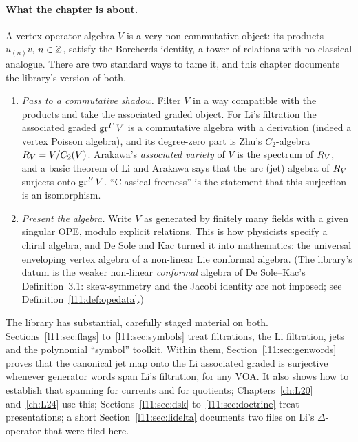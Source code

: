 \paragraph{What the chapter is about.} A vertex operator algebra $V$ is a very non-commutative
object: its products $u_{(n)}v$, $n\in{\mathbb{Z}}$, satisfy the Borcherds identity, a tower of
relations with no classical analogue. There are two standard ways to tame it, and this chapter
documents the library's version of both.
\begin{enumerate}
\item \emph{Pass to a commutative shadow.} Filter $V$ in a way compatible with the products and
  take the associated graded object. For Li's filtration the associated graded
  $\operatorname{gr}^F V$ is a commutative algebra with a derivation (indeed a vertex Poisson
  algebra), and its degree-zero part is Zhu's $C_2$-algebra $R_V = V/C_2(V)$. Arakawa's
  \emph{associated variety} of $V$ is the spectrum of $R_V$, and a basic theorem of Li and
  Arakawa says that the arc (jet) algebra of $R_V$ surjects onto $\operatorname{gr}^F V$.
  ``Classical freeness'' is the statement that this surjection is an isomorphism.
\item \emph{Present the algebra.} Write $V$ as generated by finitely many fields with a given
  singular OPE, modulo explicit relations. This is how physicists specify a chiral algebra, and De
  Sole and Kac turned it into mathematics: the universal enveloping vertex algebra of a
  non-linear Lie conformal algebra. (The library's datum  is the weaker non-linear \emph{conformal} algebra of
  De Sole--Kac's Definition~3.1: skew-symmetry and the Jacobi identity are not imposed; see Definition~\ref{l11:def:opedata}.)
\end{enumerate}
The library has substantial, carefully staged material on both. Sections~\ref{l11:sec:flags}
to~\ref{l11:sec:symbols} treat filtrations, the Li filtration, jets and the polynomial ``symbol''
toolkit. Within them, Section~\ref{l11:sec:genwords} proves that the canonical jet map onto the Li associated graded is
surjective whenever generator words span Li's filtration, for any VOA. It also shows how to establish that spanning for
currents and for quotients; Chapters~\ref{ch:L20} and~\ref{ch:L24} use this; Sections~\ref{l11:sec:dsk} to~\ref{l11:sec:doctrine} treat presentations; a short
Section~\ref{l11:sec:lidelta} documents two files on Li's $\Delta$-operator that were filed here.

